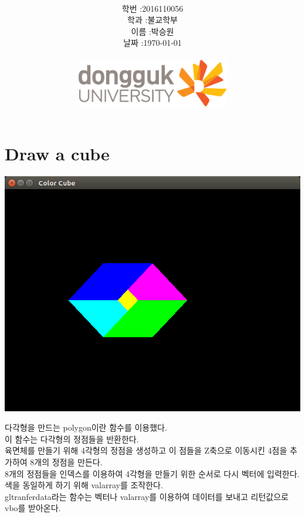 \documentclass[12pt,a4paper]{article}
\title{
	\centering
	\pgfornament[width=12cm,color=teal]{84}\\
	\vspace{1cm}
	\fontsize{50}{50} \selectfont {컴퓨터 그래픽스 입문}\\
		\pgfornament[width=12cm,color=teal]{88}\\
	\vfill}
\author{
	\LARGE
	\begin{tabular}{rl}
		\hline
		학번 : & 2016110056\\ 
		학과 : & 불교학부 \\
		이름 : & 박승원\\
		날짜 : & \today\\
		\hline
	\end{tabular}\vspace{2cm}
	\\
\includegraphics[width=0.5\textwidth]{logo.jpg}
	}
\date{}
\begin{document}
\maketitle
{}
\noindent
\lstset{language=C++, columns=flexible, tabsize=4, frame=shadowbox, showstringspaces=false, breaklines=true, upquote=true, basicstyle=\normalsize}

\section{Draw a cube}
\includegraphics[width=\textwidth]{2.png}
	
다각형을 만드는 polygon이란 함수를 이용했다.\\
이 함수는 다각형의 정점들을 반환한다.\\
육면체를 만들기 위해 4각형의 정점을 생성하고 이 점들을 Z축으로 이동시킨 4점을 추가하여 8개의 정점을 만든다.\\
8개의 정점들을 인덱스를 이용하여 4각형을 만들기 위한 순서로 다시 벡터에 입력한다.\\
색을 동일하게 하기 위해 valarray를 조작한다.\\
gltranferdata라는 함수는 벡터나 valarray를 이용하여 데이터를 보내고 리턴값으로 vbo를 받아온다.
\end{document}
